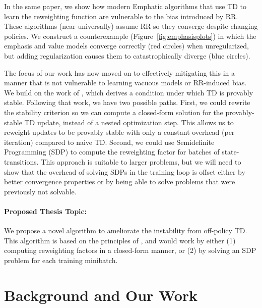 \documentclass[11pt]{article}
\begin{document}
In the same paper, we show how modern Emphatic algorithms that use TD to learn the reweighting function are vulnerable to the bias introduced by RR. These algorithms (near-universally) assume RR so they converge despite changing policies. We construct a counterexample (Figure~\ref{fig:emphasisplots}) in which the emphasis and value models converge correctly (red circles) when unregularized, but adding regularization causes them to catastrophically diverge (blue circles).


The focus of our work has now moved on to effectively mitigating this in a manner that is not vulnerable to learning vacuous models or RR-induced bias. We build on the work of \citet{kolter2011fixed}, which derives a condition under which TD is provably stable. Following that work, we have two possible paths. First, we could rewrite the stability criterion so we can compute a closed-form solution for the provably-stable TD update, instead of a nested optimization step. This allows us to reweight updates to be provably stable with only a constant overhead (per iteration) compared to naive TD. Second, we could use Semidefinite Programming (SDP) to compute the reweighting factor for batches of state-transitions. This approach is suitable to larger problems, but we will need to show that the overhead of solving SDPs in the training loop is offset either by better convergence properties or by being able to solve problems that were previously not solvable.

\paragraph{Proposed Thesis Topic:} We propose a novel algorithm to ameliorate the instability from off-policy TD. This algorithm is based on the principles of \cite{kolter2011fixed}, and would work by either (1) computing reweighting factors in a closed-form manner, or (2) by solving an SDP problem for each training minibatch.

\section{Background and Our Work}
\end{document}
